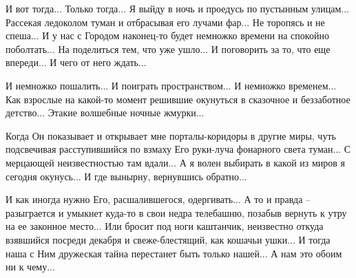 И вот тогда... Только тогда... Я выйду в ночь и проедусь по пустынным улицам...
Рассекая ледоколом туман и отбрасывая его лучами фар... Не торопясь и не
спеша... И у нас с Городом наконец-то будет немножко времени на спокойно
поболтать... На поделиться тем, что уже ушло... И поговорить за то, что еще
впереди... И чего от него ждать...

И немножко пошалить... И поиграть пространством... И немножко временем... Как
взрослые на какой-то момент решившие окунуться в сказочное и беззаботное
детство... Этакие волшебные ночные жмурки... 

Когда Он показывает и открывает мне порталы-коридоры в другие миры, чуть
подсвечивая расступившийся по взмаху Его руки-луча фонарного света  туман... С
мерцающей неизвестностью там вдали... А я волен выбирать в какой из миров я
сегодня окунусь... И где вынырну, вернувшись обратно... 

И как иногда нужно Его, расшалившегося, одергивать... А то и правда –
разыграется и умыкнет куда-то в свои недра телебашню, позабыв вернуть к утру
на ее законное место... Или бросит под ноги каштанчик, неизвестно откуда
взявшийся посреди декабря и свеже-блестящий, как кошачьи ушки... И тогда наша
с Ним дружеская тайна перестанет быть только нашей... А нам это обоим ни к
чему...

